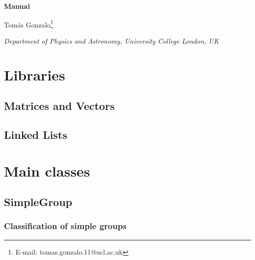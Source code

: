 \documentclass[12pt]{article}
\begin{document}
\thispagestyle{empty}
\vspace*{-1in}
\renewcommand{\thefootnote}{\fnsymbol{footnote}}

\vskip 5pt

\begin{center}
{\Large{\bf 
Manual}}
\vskip 25pt

{
Tom\'as Gonzalo\footnote{E-mail: tomas.gonzalo.11@ucl.ac.uk}
}

\vskip 10pt

{\it \small 
Department of Physics and Astronomy, University College London, UK
}\\

\medskip

\begin{abstract}
\end{abstract}

\end{center}

\medskip

\renewcommand{\thefootnote}{\arabic{footnote}}
\setcounter{footnote}{0}

\cleardoublepage
\setcounter{page}{1}
\tableofcontents

\cleardoublepage
\setcounter{page}{1}


\section{Libraries}

\subsection{Matrices and Vectors}

\subsection{Linked Lists}

\section{Main classes}

\subsection{SimpleGroup}

\subsubsection{Classification of simple groups}
\end{document}
